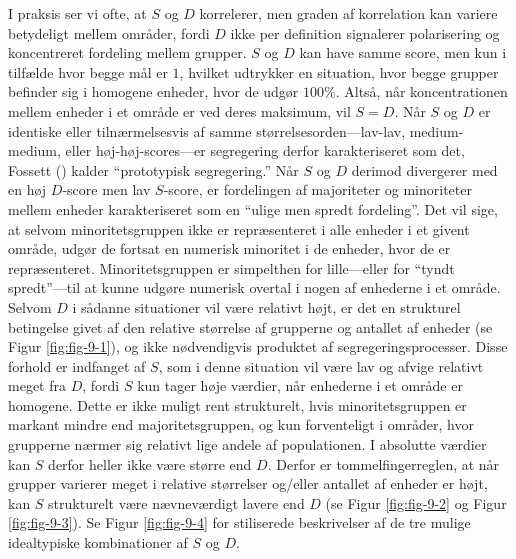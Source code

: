 \documentclass[
]{book}
\begin{document}
I praksis ser vi ofte, at \(S\) og \(D\) korrelerer, men graden af korrelation kan variere betydeligt mellem områder, fordi \(D\) ikke per definition signalerer polarisering og koncentreret fordeling mellem grupper. \(S\) og \(D\) kan have samme score, men kun i tilfælde hvor begge mål er \(1\), hvilket udtrykker en situation, hvor begge grupper befinder sig i homogene enheder, hvor de udgør \(100\%\). Altså, når koncentrationen mellem enheder i et område er ved deres maksimum, vil \(S=D\). Når \(S\) og \(D\) er identiske eller tilnærmelsesvis af samme størrelsesorden---lav-lav, medium-medium, eller høj-høj-scores---er segregering derfor karakteriseret som det, Fossett () kalder ``prototypisk segregering.'' Når \(S\) og \(D\) derimod divergerer med en høj \(D\)-score men lav \(S\)-score, er fordelingen af majoriteter og minoriteter mellem enheder karakteriseret som en ``ulige men spredt fordeling''. Det vil sige, at selvom minoritetsgruppen ikke er repræsenteret i alle enheder i et givent område, udgør de fortsat en numerisk minoritet i de enheder, hvor de er repræsenteret. Minoritetsgruppen er simpelthen for lille---eller for ``tyndt spredt''---til at kunne udgøre numerisk overtal i nogen af enhederne i et område. Selvom \(D\) i sådanne situationer vil være relativt højt, er det en strukturel betingelse givet af den relative størrelse af grupperne og antallet af enheder (se Figur \ref{fig:fig-9-1}), og ikke nødvendigvis produktet af segregeringsprocesser. Disse forhold er indfanget af \(S\), som i denne situation vil være lav og afvige relativt meget fra \(D\), fordi \(S\) kun tager høje værdier, når enhederne i et område er homogene. Dette er ikke muligt rent strukturelt, hvis minoritetsgruppen er markant mindre end majoritetsgruppen, og kun forventeligt i områder, hvor grupperne nærmer sig relativt lige andele af populationen. I absolutte værdier kan \(S\) derfor heller ikke være større end \(D\). Derfor er tommelfingerreglen, at når grupper varierer meget i relative størrelser og/eller antallet af enheder er højt, kan \(S\) strukturelt være nævneværdigt lavere end \(D\) (se Figur \ref{fig:fig-9-2} og Figur \ref{fig:fig-9-3}). Se Figur \ref{fig:fig-9-4} for stiliserede beskrivelser af de tre mulige idealtypiske kombinationer af \(S\) og \(D\).
\end{document}
